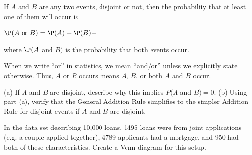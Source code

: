 \documentclass{ccg-topic}
\begin{document}
\begin{defn}
  If $A$ and $B$ are any two events, disjoint or not, then
  the probability that at least one of them will occur is
  \begin{center}
      $\P(A\text{ or }B) = \P(A) + \P(B) - $ 
  \end{center}
  where $\P(A$ and $B)$ is the probability that both events occur.
\end{defn}

\begin{tipBox}{
When we write ``or'' in statistics, we mean ``and/or'' unless we explicitly state otherwise. Thus, $A$ or $B$ occurs means $A$, $B$, or both $A$ and $B$ occur.}
\end{tipBox}

\begin{todo}
(a) If $A$ and $B$ are disjoint, describe why this implies $P(A$ and $B) = 0$. (b) Using part (a), verify that the General Addition Rule simplifies to the simpler Addition Rule for disjoint events if $A$ and $B$ are disjoint.\footnotemark
\end{todo}


\begin{todo}\label{emailSpamNumberVennExer}
In the  data set describing 10,000 loans,
1495 loans were from joint applications
(e.g. a couple applied together),
4789 applicants had a mortgage,
and 950 had both of these characteristics.
Create a Venn diagram for this setup.\footnotemark
\end{todo}
\end{document}
